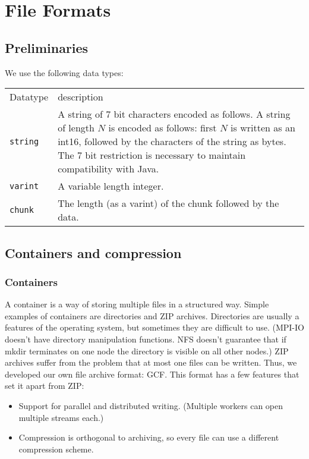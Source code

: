 \chapter{File Formats}

\section{Preliminaries}

We use the following data types:
\par\noindent\begin{tabularx}{\textwidth}{@{}lX@{}}
Datatype & description
\\
{\tt string} & A string of 7 bit characters encoded as follows. A string of length $N$ is encoded as follows:
first $N$ is written as an int16, followed by the characters of the string as bytes. The 7 bit restriction is
necessary to maintain compatibility with Java.
\\
{\tt varint} & A variable length integer.
\\
{\tt chunk} & The length (as a varint) of the chunk followed by the data.
\end{tabularx}

\section{Containers and compression}

\subsection{Containers}

A container is a way of storing multiple files in a structured way. Simple examples of containers are
directories and ZIP archives. Directories are usually a features of the operating system,
but sometimes they are difficult to use. (MPI-IO doesn't have directory manipulation functions.
NFS doesn't guarantee that if mkdir terminates on one node the directory is visible on all other nodes.)
ZIP archives suffer from the problem that at most one files can be written.
Thus, we developed our own file archive format: GCF. This format has a few features that set it apart from ZIP:
\begin{itemize}
\item Support for parallel and distributed writing. (Multiple workers can open multiple streams each.)
\item Compression is orthogonal to archiving, so every file can use a different compression scheme.
\end{itemize}

